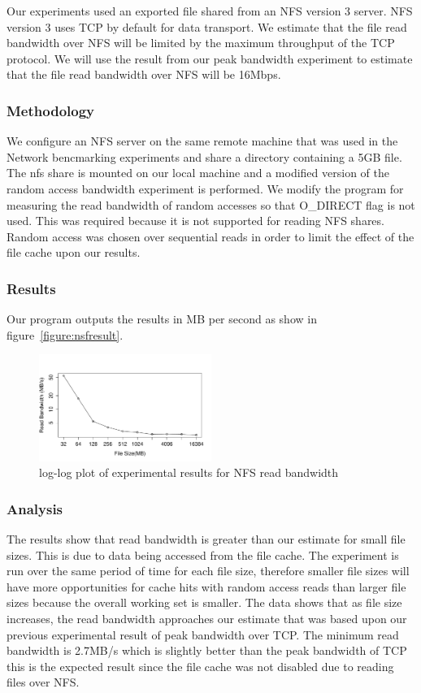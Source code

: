 Our experiments used an exported file shared from an NFS version 3 server. NFS
version 3 uses TCP by default for data transport.  We estimate that the file
read bandwidth over NFS will be limited by the maximum throughput of the TCP
protocol. We will use the result from our peak bandwidth experiment to estimate 
that the file read bandwidth over NFS will be 16Mbps.

\subsubsection{Methodology}

We configure an NFS server on the same remote machine that was used in the Network bencmarking experiments and share a directory containing a 5GB file. The nfs share is mounted on our local machine and a 
modified version of the random access bandwidth experiment is performed. We modify the program for measuring the read bandwidth of random accesses so that O_DIRECT flag is not used. This was required because 
it is not supported for reading NFS shares. Random access was chosen over sequential reads in order to limit the effect of the file cache upon our results.

\subsubsection{Results}

Our program outputs the results in MB per second as show in figure~\ref{figure:nsfresult}.

\begin{figure}
    \centering
    \includegraphics[width=0.5\textwidth]{nfsresults.pdf}
    \caption{log-log plot of experimental results for NFS read bandwidth}
    \label{figure:nfsresult}
\end{figure}

\subsubsection{Analysis}

The results show that read bandwidth is greater than our estimate for small
file sizes. This is due to data being accessed from the file cache.  The
experiment is run over the same period of time for each file size, therefore
smaller file sizes will have more opportunities for cache hits with random
access reads than larger file sizes because the overall working set is smaller.
The data shows that as file size increases, the read bandwidth approaches our
estimate that was based upon our previous experimental result of peak bandwidth
over TCP. The minimum read bandwidth is 2.7MB/s which is slightly better than
the peak bandwidth of TCP this is the expected result since the file cache was
not disabled due to reading files over NFS.

